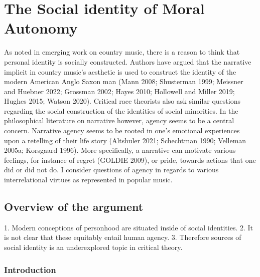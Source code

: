 \documentclass[12pt]{book}
\theoremstyle{definition}
\theoremstyle{remark}
\newcommand{\NormalTok}[1]{#1}
\newenvironment{Shaded}{}{}
\newenvironment{Highlighting}{}{}
\begin{document}
\chapter{The Social identity of Moral Autonomy}\label{the-social-identity-of-moral-autonomy}

As noted in emerging work on country music, there is a reason to think that personal identity is socially constructed. Authors have argued that the narrative implicit in country music's aesthetic is used to construct the identity of the modern American Anglo Saxon man (Mann 2008; Shusterman 1999; Meissner and Huebner 2022; Grossman 2002; Hayes 2010; Hollowell and Miller 2019; Hughes 2015; Watson 2020). Critical race theorists also ask similar questions regarding the social construction of the identities of social minorities. In the philosophical literature on narrative however, agency seems to be a central concern. Narrative agency seems to be rooted in one's emotional experiences upon a retelling of their life story (Altshuler 2021; Schechtman 1990; Velleman 2005a; Korsgaard 1996). More specifically, a narrative can motivate various feelings, for instance of regret (GOLDIE 2009), or pride, towards actions that one did or did not do. I consider questions of agency in regards to various interrelational virtues as represented in popular music.

\section{Overview of the argument}\label{overview-of-the-argument}

\begin{Shaded}
\begin{Highlighting}[]

\NormalTok{1. Modern conceptions of personhood are situated inside of social identities.}
\NormalTok{2. It is not clear that these equitably entail human agency.}
\NormalTok{3. Therefore sources of social identity is an underexplored topic in critical theory.}
\end{Highlighting}
\end{Shaded}

\subsection{Introduction}\label{introduction-1}
\end{document}
